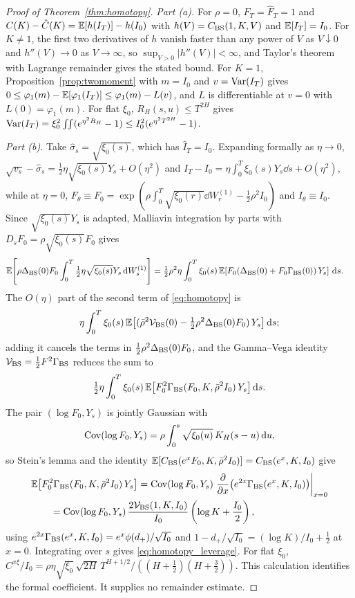 \begin{proof}[Proof of Theorem~\ref{thm:homotopy}]
\emph{Part (a).} For $\rho=0$, $F_T=\hat{F}_T=1$ and $C(K)-\hat{C}(K)=\mathbb{E}[h(I_T)]-h(I_0)$ with $h(V)=C_{\mathrm{BS}}(1,K,V)$ and $\mathbb{E}[I_T]=I_0$. For $K\ne1$, the first two derivatives of $h$ vanish faster than any power of $V$ as $V\downarrow0$ and $h''(V)\to0$ as $V\to\infty$, so $\sup_{V>0}|h''(V)|<\infty$, and Taylor's theorem with Lagrange remainder gives the stated bound. For $K=1$, Proposition~\ref{prop:twomoment} with $m=I_0$ and $v=\operatorname{Var}(I_T)$ gives $0\le\varphi_1(m)-\mathbb{E}[\varphi_1(I_T)]\le\varphi_1(m)-L(v)$, and $L$ is differentiable at $v=0$ with $L(0)=\varphi_1(m)$. For flat $\xi_0$, $R_H(s,u)\le T^{2H}$ gives $\operatorname{Var}(I_T)=\xi_0^2\int\!\!\int(e^{\eta^2R_H}-1)\le I_0^2(e^{\eta^2T^{2H}}-1)$.

\emph{Part (b).} Take $\hat{\sigma}_s=\sqrt{\xi_0(s)}$, which has $\hat{I}_T=I_0$. Expanding formally as $\eta\to 0$, $\sqrt{v_s}-\hat{\sigma}_s=\tfrac12\eta\sqrt{\xi_0(s)}Y_s + O(\eta^2)$ and $I_T-I_0=\eta\int_0^T\xi_0(s)Y_s\dd s + O(\eta^2)$, while at $\eta=0$, $F_\theta\equiv F_0=\exp(\rho\int_0^T\sqrt{\xi_0(r)}\dd W_r^{(1)}-\tfrac12\rho^2 I_0)$ and $I_\theta\equiv I_0$. Since $\sqrt{\xi_0(s)}Y_s$ is adapted, Malliavin integration by parts \citep{Nualart2006} with $D_s F_0=\rho\sqrt{\xi_0(s)}F_0$ gives
\[
  \begin{aligned}
  &\mathbb{E}\!\left[\rho\Delta_{\mathrm{BS}}(0)F_0\int_0^T\tfrac12\eta\sqrt{\xi_0(s)}Y_s\,\mathrm{d} W_s^{(1)}\right]
   = \tfrac12\rho^2\eta\int_0^T \xi_0(s)\,\mathbb{E}\!\left[F_0(\Delta_{\mathrm{BS}}(0)+F_0\Gamma_{\mathrm{BS}}(0))\,Y_s\right]\,\mathrm{d} s.
  \end{aligned}
\]
The $O(\eta)$ part of the second term of \eqref{eq:homotopy} is
\[
  \eta\int_0^T\xi_0(s)\,\mathbb{E}\bigl[(\bar{\rho}^2\mathcal{V}_{\mathrm{BS}}(0)-\tfrac12\rho^2\Delta_{\mathrm{BS}}(0)F_0)\,Y_s\bigr]\,\mathrm{d} s;
\]
adding it cancels the terms in $\tfrac12\rho^2\Delta_{\mathrm{BS}}(0)F_0$, and the Gamma--Vega identity $\mathcal{V}_{\mathrm{BS}}=\tfrac12 F^2\Gamma_{\mathrm{BS}}$ reduces the sum to
\[
  \tfrac12\eta\int_0^T\xi_0(s)\,\mathbb{E}\bigl[F_0^2\Gamma_{\mathrm{BS}}(F_0,K,\bar{\rho}^2 I_0)\,Y_s\bigr]\,\mathrm{d} s.
\]
The pair $(\log F_0,Y_s)$ is jointly Gaussian with
\[
  \operatorname{Cov}(\log F_0,Y_s)=\rho\int_0^s\sqrt{\xi_0(u)}\,K_H(s-u)\,\mathrm{d} u,
\]
so Stein's lemma and the identity $\mathbb{E}[C_{\mathrm{BS}}(e^x F_0,K,\bar{\rho}^2 I_0)]=C_{\mathrm{BS}}(e^x,K,I_0)$ give
\[
  \begin{aligned}
    &\mathbb{E}\!\left[F_0^2\Gamma_{\mathrm{BS}}(F_0,K,\bar{\rho}^2 I_0)\,Y_s\right]
     = \operatorname{Cov}(\log F_0,Y_s)\left.\frac{\partial}{\partial x}\!\left(e^{2x}\Gamma_{\mathrm{BS}}(e^x,K,I_0)\right)\right|_{x=0} \\
    &\qquad = \operatorname{Cov}(\log F_0,Y_s)\,\frac{2\mathcal{V}_{\mathrm{BS}}(1,K,I_0)}{I_0}\left(\log K + \frac{I_0}{2}\right),
  \end{aligned}
\]
using $e^{2x}\Gamma_{\mathrm{BS}}(e^x,K,I_0)=e^x\phi(d_+)/\sqrt{I_0}$ and $1-d_+/\sqrt{I_0}=(\log K)/I_0+\tfrac12$ at $x=0$. Integrating over $s$ gives \eqref{eq:homotopy_leverage}. For flat $\xi_0$, $C^{x\xi}/I_0 = \rho\eta\sqrt{\xi_0}\,\sqrt{2H}\,T^{H+1/2}/((H+\tfrac12)(H+\tfrac32))$. This calculation identifies the formal coefficient. It supplies no remainder estimate.
\end{proof}

